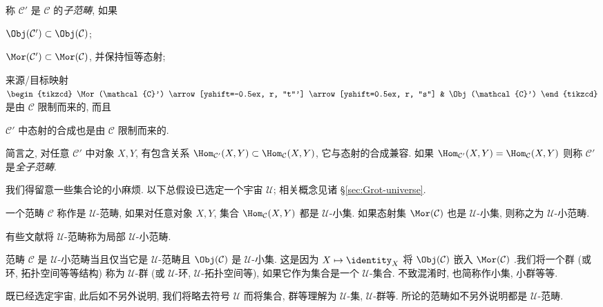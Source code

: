 \begin{definition}\label{def:subcategory}
	称 $\mathcal{C}'$ 是 $\mathcal{C}$ 的\emph{子范畴}, 如果
	\begin{compactenum}[(i)]
		\item $\Obj(\mathcal{C}') \subset \Obj(\mathcal{C})$;
		\item $\Mor(\mathcal{C}') \subset \Mor(\mathcal{C})$, 并保持恒等态射;
		\item 来源/目标映射 $\begin{tikzcd} \Mor(\mathcal{C}') \arrow[yshift=-0.5ex, r, "t"'] \arrow[yshift=0.5ex, r, "s"] & \Obj(\mathcal{C}') \end{tikzcd}$ 是由 $\mathcal{C}$ 限制而来的, 而且
		\item $\mathcal{C}'$ 中态射的合成也是由 $\mathcal{C}$ 限制而来的.
	\end{compactenum}

	简言之, 对任意 $\mathcal{C}'$ 中对象 $X, Y$, 有包含关系 $\Hom_{\mathcal{C}'}(X, Y) \subset \Hom_{\mathcal{C}}(X, Y)$, 它与态射的合成兼容. 如果 $\Hom_{\mathcal{C}'}(X, Y) = \Hom_{\mathcal{C}}(X, Y)$ 则称 $\mathcal{C}'$ 是\emph{全子范畴}.
\end{definition}

我们得留意一些集合论的小麻烦. 以下总假设已选定一个宇宙 $\mathcal{U}$; 相关概念见诸 \S\ref{sec:Grot-universe}.

\begin{definition}\label{def:U-cat}
  一个范畴 $\mathcal{C}$ 称作是 $\mathcal{U}$-范畴, 如果对任意对象 $X, Y$, 集合 $\Hom_{\mathcal{C}}(X,Y)$ 都是 $\mathcal{U}$-小集. 如果态射集 $\Mor(\mathcal{C})$ 也是 $\mathcal{U}$-小集, 则称之为 $\mathcal{U}$-小范畴.
\end{definition}
有些文献将 $\mathcal{U}$-范畴称为局部 $\mathcal{U}$-小范畴.

范畴 $\mathcal{C}$ 是 $\mathcal{U}$-小范畴当且仅当它是 $\mathcal{U}$-范畴且 $\Obj(\mathcal{C})$ 是 $\mathcal{U}$-小集. 这是因为 $X \mapsto \identity_X$ 将 $\Obj(\mathcal{C})$ 嵌入 $\Mor(\mathcal{C})$ .我们将一个群 (或环, 拓扑空间等等结构) 称为 $\mathcal{U}$-群 (或 $\mathcal{U}$-环, $\mathcal{U}$-拓扑空间等), 如果它作为集合是一个 $\mathcal{U}$-集合. 不致混淆时, 也简称作小集, 小群等等.

\begin{convention}\label{con:U-small}
	既已经选定宇宙, 此后如不另外说明, 我们将略去符号 $\mathcal{U}$ 而将集合, 群等理解为 $\mathcal{U}$-集, $\mathcal{U}$-群等. 所论的范畴如不另外说明都是 $\mathcal{U}$-范畴.
\end{convention}

